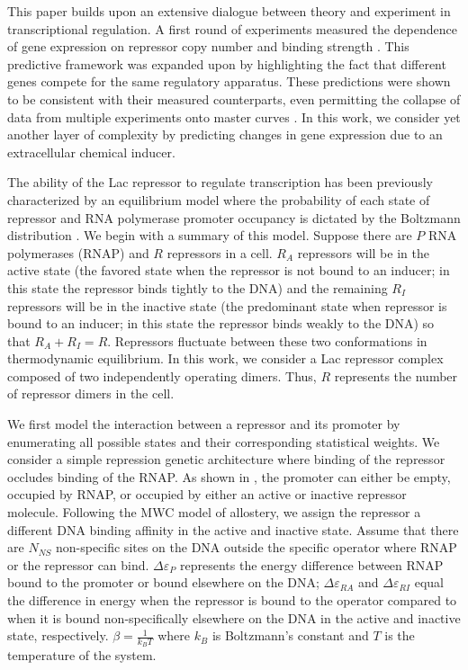 This paper builds upon an extensive dialogue between theory and experiment in
transcriptional regulation. A first round of experiments measured the
dependence of gene expression on repressor copy number and binding strength
\cite{Garcia2011}. This predictive framework was expanded upon by highlighting the fact that different genes compete for the
same regulatory apparatus. These predictions were shown to be
consistent with their measured counterparts, even permitting the collapse of
data from multiple experiments onto master curves \cite{Brewster2014,
Weinert2014}. In this work, we consider yet another layer of complexity
by predicting changes in gene expression due to an extracellular chemical
inducer.

The ability of the Lac repressor  to regulate transcription has been previously characterized by an
equilibrium model where the probability of each state of repressor and RNA
polymerase promoter occupancy is dictated by the Boltzmann distribution
\cite{Daber2011a, Phillips2015a}. We begin with a summary of this model. Suppose
there are \(P\) RNA polymerases (RNAP) and \(R\) repressors in a cell. \(R_A\)
repressors will be in the active state (the favored state when the repressor is
not bound to an inducer; in this state the repressor binds tightly to the DNA)
and the remaining \(R_I\) repressors will be in the inactive state (the
predominant state when repressor is bound to an inducer; in this state the
repressor binds weakly to the DNA) so that \(R_A+R_I=R\). Repressors fluctuate
between these two conformations in thermodynamic equilibrium\cite{Kern2003}. In
this work, we consider a Lac repressor complex composed of two independently
operating dimers. Thus, $R$ represents the number of repressor dimers in the
cell. 

We first model the interaction between a repressor and its promoter by
enumerating all possible states and their corresponding statistical weights. We
consider a simple repression genetic architecture where binding of the
repressor occludes binding of the RNAP. As shown in
\fref[figpolymeraseRepressorStates], the promoter can either be empty,
occupied by RNAP, or occupied by either an active or inactive repressor
molecule. Following the MWC model of allostery, we assign the repressor a
different DNA binding affinity in the active and inactive state. Assume that
there are $N_{NS}$ non-specific sites on the DNA outside the specific operator where
RNAP or the repressor can bind. \(\Delta\varepsilon_{P}\) represents the
energy difference between RNAP bound to the promoter or bound elsewhere on
the DNA; \(\Delta\varepsilon_{RA}\) and \(\Delta\varepsilon_{RI}\) equal the
difference in energy when the repressor is bound to the operator
compared to when it is bound non-specifically elsewhere on the DNA in the
active and inactive state, respectively. $\beta = \frac{1}{k_BT}$ where $k_B$
is Boltzmann's constant and $T$ is the temperature of the system.

